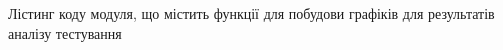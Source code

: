 \append{}
Лістинг коду модуля, що містить функції для побудови графіків для результатів
аналізу тестування
\lstset{inputencoding=utf8, extendedchars=\true}

